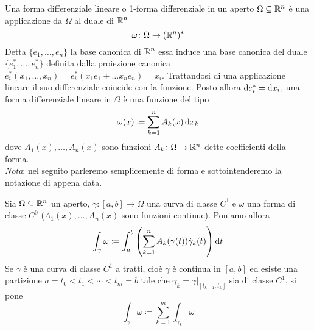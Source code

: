 \begin{definition}
	Una forma differenziale lineare o 1-forma differenziale in un aperto $ \Omega \subseteq \mathbb{R}^n $ è una applicazione da $ \Omega $ al duale di $ \mathbb{R}^n $
	\begin{equation*}
		\omega \colon \Omega \to (\mathbb{R}^n)^{*}
	\end{equation*}
	Detta $ \{e_1, \ldots, e_n\} $ la base canonica di $ \mathbb{R}^n $ essa induce una base canonica del duale $ \{e_1^{*}, \ldots, e_n^{*}\} $ definita dalla proiezione canonica $ e^{*}_{i}(x_1, \ldots, x_n) = e^{*}_{i}(x_1e_1 + \ldots x_ne_n) = x_i $. Trattandosi di una applicazione lineare il suo differenziale coincide con la funzione. Posto allora $ \dif{e_i^{*}} = \dif{x_i} $, una forma differenziale lineare in $ \Omega $ è una funzione del tipo
	\begin{equation}
		\omega(x) \coloneqq \sum_{k = 1}^{n} A_k(x) \dif{x_k}
	\end{equation}
	dove $ A_1(x), \ldots, A_n(x) $ sono funzioni $ A_k \colon \Omega \to \mathbb{R}^n $ dette coefficienti della forma. \\
	\emph{Nota}: nel seguito parleremo semplicemente di forma e sottointenderemo la notazione di appena data.
\end{definition}

\begin{definition}
	Sia $ \Omega \subseteq \mathbb{R}^n $ un aperto, $ \gamma \colon [a, b] \to \Omega $ una curva di classe $ C^1 $ e $ \omega $ una forma di classe $ C^0 $ ($ A_1(x), \ldots, A_n(x) $ sono funzioni continue). Poniamo allora
	\begin{equation}
		\int_{\gamma} \omega \coloneqq \int_{a}^{b} \left(\sum_{k = 1}^{n} A_k(\gamma(t)) \dot{\gamma}_k(t)\right) \dif{t}
	\end{equation}
	Se $ \gamma $ è una curva di classe $ C^1 $ a tratti, cioè $ \gamma $ è continua in $ [a, b] $ ed esiste una partizione $ a = t_0 < t_1 < \cdots < t_m = b $ tale che $ \gamma_k = \gamma\lvert_{[t_{k - 1}, t_k]} $ sia di classe $ C^1 $, si pone
	\begin{equation}
		\int_{\gamma} \omega \coloneqq \sum_{k = 1}^{m} \int_{\gamma_k} \omega
	\end{equation}
\end{definition}

